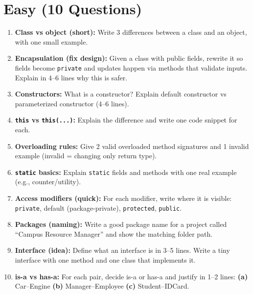 \documentclass[11pt,a4paper]{article}
\begin{document}
\section*{Easy (10 Questions)}
\begin{enumerate}[label=E\arabic*., leftmargin=*]
  \item \textbf{Class vs object (short):} Write 3 differences between a class and an object, with one small example.

  \item \textbf{Encapsulation (fix design):} Given a class with public fields, rewrite it so fields become \texttt{private}
    and updates happen via methods that validate inputs. Explain in 4--6 lines why this is safer.

  \item \textbf{Constructors:} What is a constructor? Explain default constructor vs parameterized constructor (4--6 lines).

  \item \textbf{\texttt{this} vs \texttt{this(...)}:} Explain the difference and write one code snippet for each.

  \item \textbf{Overloading rules:} Give 2 valid overloaded method signatures and 1 invalid example
    (invalid = changing only return type).

  \item \textbf{\texttt{static} basics:} Explain \texttt{static} fields and methods with one real example (e.g., counter/utility).

  \item \textbf{Access modifiers (quick):} For each modifier, write where it is visible:
    \texttt{private}, default (package-private), \texttt{protected}, \texttt{public}.

  \item \textbf{Packages (naming):} Write a good package name for a project called ``Campus Resource Manager''
    and show the matching folder path.

  \item \textbf{Interface (idea):} Define what an interface is in 3--5 lines. Write a tiny interface with one method
    and one class that implements it.

  \item \textbf{is-a vs has-a:} For each pair, decide is-a or has-a and justify in 1--2 lines:
    \textbf{(a)} Car--Engine \textbf{(b)} Manager--Employee \textbf{(c)} Student--IDCard.
\end{enumerate}
\end{document}
